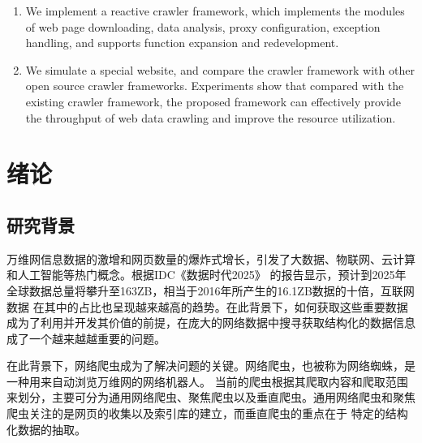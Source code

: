 \documentclass[master]{njuthesis}
\begin{document}
\begin{englishabstract}
\begin{enumerate}
\item We implement a reactive crawler framework, which implements the modules of web page downloading, data analysis, proxy configuration, exception handling, and supports function expansion and redevelopment.

\item We simulate a special website, and compare the crawler framework with other open source crawler frameworks. Experiments show that compared with the existing crawler framework, the proposed framework can effectively provide the throughput of web data crawling and improve the resource utilization.
\end{enumerate}
\end{englishabstract}


\tableofcontents

\listoffigures

\listoftables

\mainmatter

\chapter{绪论}\label{chapter_introduction}
\section{研究背景}

万维网信息数据的激增和网页数量的爆炸式增长，引发了大数据、物联网、云计算和人工智能等热门概念。根据IDC《数据时代2025》
的报告显示，预计到2025年全球数据总量将攀升至163ZB，相当于2016年所产生的16.1ZB数据的十倍\cite{rydning2018digitization}，互联网数据
在其中的占比也呈现越来越高的趋势。在此背景下，如何获取这些重要数据成为了利用并开发其价值的前提，在庞大的网络数据中搜寻获取结构化的数据信息成了一个越来越越重要的问题。

在此背景下，网络爬虫成为了解决问题的关键。网络爬虫，也被称为网络蜘蛛，是一种用来自动浏览万维网的网络机器人\cite{abiteboul2000queries}。
当前的爬虫根据其爬取内容和爬取范围来划分，主要可分为通用网络爬虫、聚焦爬虫以及垂直爬虫。通用网络爬虫和聚焦爬虫关注的是网页的收集以及索引库的建立，而垂直爬虫的重点在于
特定的结构化数据的抽取。
\end{document}
